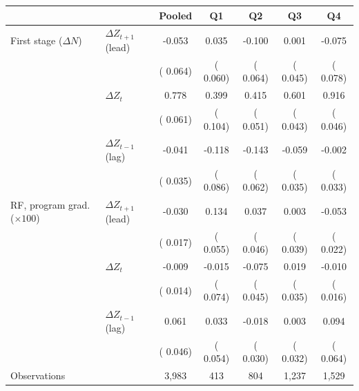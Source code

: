 \begin{tabular}{llccccc}
\toprule
 & & Pooled & Q1 & Q2 & Q3 & Q4 \\
\midrule
First stage (\(\Delta N\)) & \(\Delta Z_{t+1}\) (lead) &  -0.053 &   0.035 &  -0.100 &   0.001 &  -0.075 \\
 &  & ( 0.064) & ( 0.060) & ( 0.064) & ( 0.045) & ( 0.078) \\
 & \(\Delta Z_t\) &   0.778\sym{***} &   0.399\sym{***} &   0.415\sym{***} &   0.601\sym{***} &   0.916\sym{***} \\
 &  & ( 0.061) & ( 0.104) & ( 0.051) & ( 0.043) & ( 0.046) \\
 & \(\Delta Z_{t-1}\) (lag) &  -0.041 &  -0.118 &  -0.143\sym{**} &  -0.059\sym{*} &  -0.002 \\
 &  & ( 0.035) & ( 0.086) & ( 0.062) & ( 0.035) & ( 0.033) \\
\addlinespace
RF, program grad. (\(\times 100\)) & \(\Delta Z_{t+1}\) (lead) &  -0.030\sym{*} &   0.134\sym{**} &   0.037 &   0.003 &  -0.053\sym{**} \\
 &  & ( 0.017) & ( 0.055) & ( 0.046) & ( 0.039) & ( 0.022) \\
 & \(\Delta Z_t\) &  -0.009 &  -0.015 &  -0.075\sym{*} &   0.019 &  -0.010 \\
 &  & ( 0.014) & ( 0.074) & ( 0.045) & ( 0.035) & ( 0.016) \\
 & \(\Delta Z_{t-1}\) (lag) &   0.061 &   0.033 &  -0.018 &   0.003 &   0.094 \\
 &  & ( 0.046) & ( 0.054) & ( 0.030) & ( 0.032) & ( 0.064) \\
\addlinespace
Observations &  &  3,983 &    413 &    804 &  1,237 &  1,529 \\
\bottomrule
\end{tabular}
